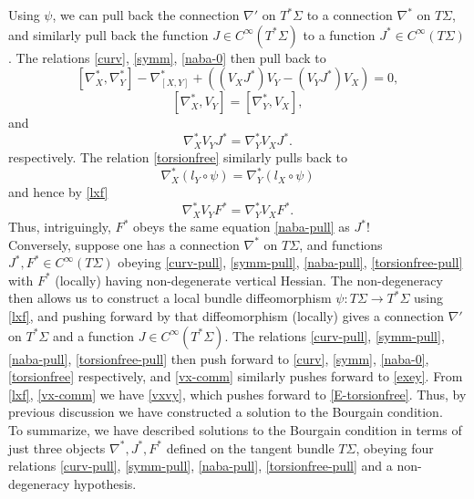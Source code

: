 \documentclass{article}
\numberwithin{equation}{section}
\theoremstyle{plain}
\begin{document}
Using $\psi$, we can pull back the connection $\nabla'$ on $T^* \Sigma$ to a connection $\nabla^*$ on $T\Sigma$, and similarly pull back the function $J \in C^\infty(T^* \Sigma)$ to a function $J^* \in C^\infty(T\Sigma)$.  The relations \eqref{curv}, \eqref{symm}, \eqref{naba-0} then pull back to
\begin{equation}\label{curv-pull}
    [\nabla^*_X,\nabla^*_Y] - \nabla^*_{[X,Y]} + ((V_X J^*) V_Y - (V_Y J^*) V_X) = 0,
\end{equation}
\begin{equation}\label{symm-pull}
    [\nabla^*_X,V_Y] = [\nabla^*_Y, V_X],
\end{equation}
and
\begin{equation}\label{naba-pull}
    \nabla^*_X V_Y J^* = \nabla^*_Y V_X J^*.
\end{equation}
respectively.  The relation \eqref{torsionfree} similarly pulls back to
$$
\nabla^*_X (l_Y \circ \psi) = \nabla^*_Y (l_X \circ \psi)$$
and hence by \eqref{lxf}
\begin{equation}\label{torsionfree-pull}
\nabla^*_X V_Y F^* = \nabla^*_Y V_X F^*.
\end{equation}
Thus, intriguingly, $F^*$ obeys the same equation \eqref{naba-pull} as $J^*$!\\

Conversely, suppose one has a connection $\nabla^*$ on $T \Sigma$, and functions $J^*, F^* \in C^\infty(T\Sigma)$ obeying \eqref{curv-pull}, \eqref{symm-pull}, \eqref{naba-pull}, \eqref{torsionfree-pull} with $F^*$ (locally) having non-degenerate vertical Hessian.  The non-degeneracy then allows us to construct a local bundle diffeomorphism $\psi: T\Sigma \to T^*\Sigma$ using \eqref{lxf}, and pushing forward by that diffeomorphism (locally) gives a connection $\nabla'$ on $T^*\Sigma$ and a function $J \in C^\infty(T^*\Sigma)$.  The relations \eqref{curv-pull}, \eqref{symm-pull}, \eqref{naba-pull}, \eqref{torsionfree-pull} then push forward to \eqref{curv}, \eqref{symm}, \eqref{naba-0}, \eqref{torsionfree} respectively, and \eqref{vx-comm} similarly pushes forward to \eqref{exey}.  From \eqref{lxf}, \eqref{vx-comm} we have \eqref{vxvy}, which pushes forward to \eqref{E-torsionfree}.  Thus, by previous discussion we have constructed a solution to the Bourgain condition.\\

To summarize, we have described solutions to the Bourgain condition in terms of just three objects $\nabla^*, J^*, F^*$ defined on the tangent bundle $T\Sigma$, obeying four relations \eqref{curv-pull}, \eqref{symm-pull}, \eqref{naba-pull}, \eqref{torsionfree-pull} and a non-degeneracy hypothesis. \\
\end{document}

